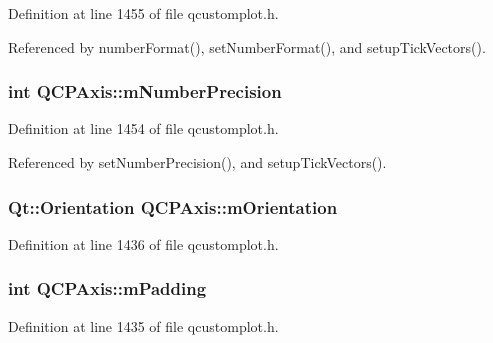 Definition at line 1455 of file qcustomplot.\+h.



Referenced by number\+Format(), set\+Number\+Format(), and setup\+Tick\+Vectors().

\hypertarget{class_q_c_p_axis_acd76e8c783384d99ccc4a13797eec188}{}
\subsubsection[{m\+Number\+Precision}]{\setlength{\rightskip}{0pt plus 5cm}int Q\+C\+P\+Axis\+::m\+Number\+Precision\hspace{0.3cm}{\ttfamily [protected]}}\label{class_q_c_p_axis_acd76e8c783384d99ccc4a13797eec188}


Definition at line 1454 of file qcustomplot.\+h.



Referenced by set\+Number\+Precision(), and setup\+Tick\+Vectors().

\hypertarget{class_q_c_p_axis_a048e1792fa86f4f86df55200b3f0be36}{}
\subsubsection[{m\+Orientation}]{\setlength{\rightskip}{0pt plus 5cm}Qt\+::\+Orientation Q\+C\+P\+Axis\+::m\+Orientation\hspace{0.3cm}{\ttfamily [protected]}}\label{class_q_c_p_axis_a048e1792fa86f4f86df55200b3f0be36}


Definition at line 1436 of file qcustomplot.\+h.

\hypertarget{class_q_c_p_axis_a52a805a4f03231210e0880db7f77e098}{}
\subsubsection[{m\+Padding}]{\setlength{\rightskip}{0pt plus 5cm}int Q\+C\+P\+Axis\+::m\+Padding\hspace{0.3cm}{\ttfamily [protected]}}\label{class_q_c_p_axis_a52a805a4f03231210e0880db7f77e098}


Definition at line 1435 of file qcustomplot.\+h.



